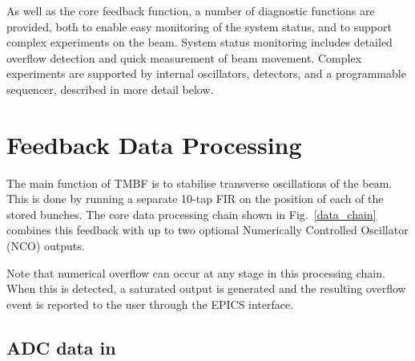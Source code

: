 \documentclass{jacow}
\newcommand{\squarecaption}[2][1]{\caption[#1]{#2\unskip\parfillskip 0pt}}
\begin{document}
As well as the core feedback function, a number of diagnostic functions are
provided, both to enable easy monitoring of the system status, and to support
complex experiments on the beam.  System status monitoring includes detailed
overflow detection and quick measurement of beam movement.  Complex experiments
are supported by internal oscillators, detectors, and a programmable sequencer,
described in more detail below.


\begin{figure*}[t]
\begin{centering}

\end{centering}
\squarecaption{
This is the core data processing chain in the TMBF processor.  Data processing
starts by adding a DC offset to each of the four ADC channels to compensate for
static ADC errors, followed by a 3-tap filter to compensate for high frequency
phase errors in the front end.  The minimum and maximum value per bunch of both
the ADC and DAC streams is captured for display.  A 10-tap filter with
programmable gain (in 6\,dB steps) is applied in turn to each bunch in the ring.
The output multiplexer adds any combination of its three inputs, which is then
scaled by a bunch specific gain.  Finally an output pre-emphasis filter corrects
for amplifier errors and is followed by a delay line to correctly close the
loop.
}
\label{data_chain}
\end{figure*}


\section{Feedback Data Processing}

The main function of TMBF is to stabilise transverse oscillations of the beam.
This is done by running a separate 10-tap FIR on the position of each of the
stored bunches.  The core data processing chain shown in Fig.~\ref{data_chain}
combines this feedback with up to two optional Numerically Controlled Oscillator
(NCO) outputs.

Note that numerical overflow can occur at any stage in this processing chain.
When this is detected, a saturated output is generated and the resulting
overflow event is reported to the user through the EPICS interface.


\subsection{ADC data in}
\end{document}
